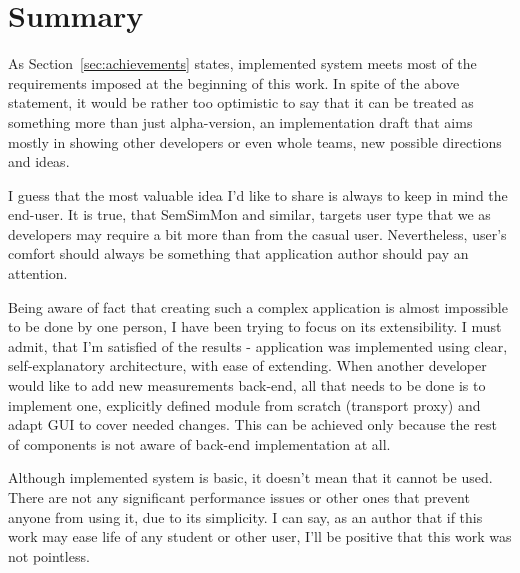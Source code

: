 %
\section{Summary}
\label{sec:summary}

As Section~\ref{sec:achievements} states, implemented system meets most of the requirements imposed at the beginning of this work. In spite of the above statement, it would be rather too optimistic to say that it can be treated as something more than just alpha-version, an implementation draft that aims mostly in showing other developers or even whole teams, new possible directions and ideas.

I guess that the most valuable idea I\rq{}d like to share is always to keep in mind the end-user. It is true, that SemSimMon and similar, targets user type that we as developers may require a bit more than from the casual user. Nevertheless, user\rq{}s comfort should always be something that application author should pay an attention.

Being aware of fact that creating such a complex application is almost impossible to be done by one person, I have been trying to focus on its extensibility. I must admit, that I\rq{}m satisfied of the results - application was implemented using clear, self-explanatory architecture, with ease of extending. When another developer would like to add new measurements back-end, all that needs to be done is to implement one, explicitly defined module from scratch (transport proxy) and adapt GUI to cover needed changes. This can be achieved only because the rest of components is not aware of back-end implementation at all.

Although implemented system is basic, it doesn\rq{}t mean that it cannot be used. There are not any significant performance issues or other ones that prevent anyone from using it, due to its simplicity. I can say, as an author that if this work may ease life of any student or other user, I\rq{}ll be positive that this work was not pointless.